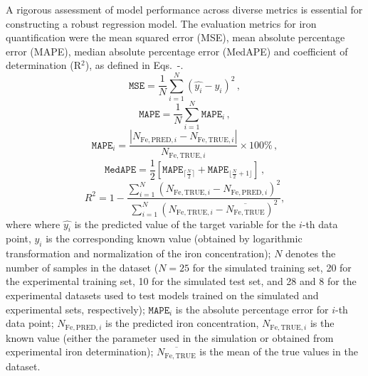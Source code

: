 \documentclass[10pt]{iopart}
\begin{document}
A rigorous assessment of model performance across diverse metrics is essential for constructing a robust regression model.
The evaluation metrics for iron quantification were the mean squared error (MSE),
mean absolute percentage error (MAPE),
median absolute percentage error (MedAPE) and
coefficient of determination (R$^2$), as defined in Eqs.~-.
\begin{equation}\label{eqMSE}
  \mathtt{MSE} = \frac{1}{N}\sum_{i=1}^{N} (\hat{y_i}-y_i)^2\,,
\end{equation}
\begin{equation}\label{eqMAPE}
  \mathtt{MAPE} = \frac{1}{N}\sum_{i=1}^{N} \mathtt{MAPE}_i\,,
\end{equation}
\begin{equation}\label{eqMAPEi}
  \mathtt{MAPE}_i = \frac{|N_{\mathrm{Fe,PRED},i}-N_{\mathrm{Fe,TRUE},i}|}{N_{\mathrm{Fe,TRUE},i}}\times 100 \%\,,
\end{equation}
\begin{equation}\label{eqMedAPE}
  \mathtt{MedAPE} = \frac{1}{2} \left[\mathtt{MAPE}_{\lceil\frac{N}{2}\rceil}+\mathtt{MAPE}_{\lfloor\frac{N}{2}+1\rfloor}\right]\,,
\end{equation}
\begin{equation}\label{eqR2}
  R^2 = 1-\frac{\displaystyle\sum_{i=1}^{N} (N_{\mathrm{Fe,TRUE},i}-N_{\mathrm{Fe,PRED},i})^2}{\displaystyle\sum_{i=1}^{N} (N_{\mathrm{Fe,TRUE},i}-\overline{{N_\mathrm{Fe,TRUE}}})^2},
\end{equation}
where
where $\hat{y_i}$ is the predicted value of the target variable for the $i$-th data point,
$y_i$ is the corresponding known value (obtained by logarithmic transformation and normalization of the iron concentration);
$N$ denotes the number of samples in the dataset
($N = 25$ for the simulated training set, 20 for the experimental training set,
10 for the simulated test set,
and 28 and 8 for the experimental datasets used to test models trained on the simulated and experimental sets, respectively);
$\mathtt{MAPE}_i$ is the  absolute percentage error for $i$-th data point;
$N_{\mathrm{Fe,PRED},i}$ is the predicted iron concentration,
$N_{\mathrm{Fe,TRUE},i}$ is the known value
(either the parameter used in the simulation or obtained from experimental iron determination);
$\overline{N_\mathrm{Fe,TRUE}}$ is the mean of the true values in the dataset.
\end{document}
